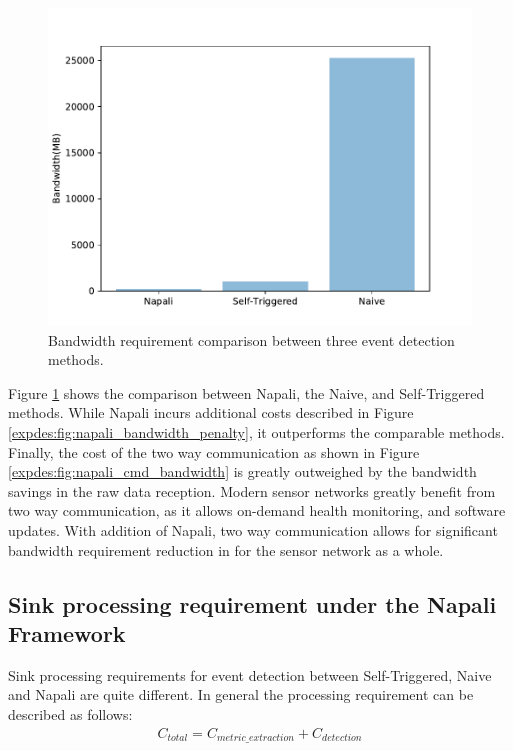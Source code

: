 \begin{figure}[ht!]
    \centering
    \includegraphics[width=0.8\linewidth]{img/napali_eval/napali_bandwidth_comparison.pdf}
    \caption{Bandwidth requirement comparison between three event detection methods.}
    \label{expdes:fig:bandwidth_master_comparison}
\end{figure}

Figure \ref{expdes:fig:bandwidth_master_comparison} shows the comparison between Napali, the Naive, and Self-Triggered methods.
While Napali incurs additional costs described in Figure \ref{expdes:fig:napali_bandwidth_penalty}, it outperforms the comparable methods.
Finally, the cost of the two way communication as shown in Figure \ref{expdes:fig:napali_cmd_bandwidth} is greatly outweighed by the bandwidth savings in the raw data reception.
Modern sensor networks greatly benefit from two way communication, as it allows on-demand health monitoring, and software updates.
With addition of Napali, two way communication allows for significant bandwidth requirement reduction in for the sensor network as a whole.

\subsection{Sink processing requirement under the Napali Framework}\label{subsec:sink-processing-requirement-under-the-napali-framework}
Sink processing requirements for event detection between Self-Triggered, Naive and Napali are quite different.
In general the processing requirement can be described as follows:
\begin{equation}\label{eq:detection_cost}
\begin{aligned}
    C_{total} = C_{metric\_extraction} + C_{detection}
\end{aligned}
\end{equation}

